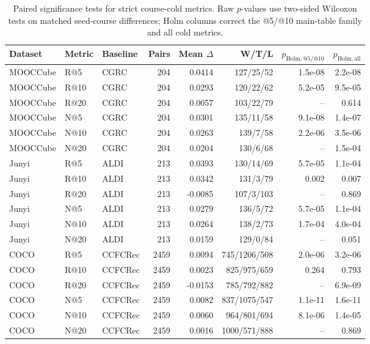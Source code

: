 \begin{table}[t]
\centering
\caption{Paired significance tests for strict course-cold metrics. Raw \(p\)-values use two-sided Wilcoxon tests on matched seed-course differences; Holm columns correct the @5/@10 main-table family and all cold metrics.}
\label{tab:supp-significance-tests}
\tablecaptiongap
\small
\setlength{\tabcolsep}{3.4pt}
\begin{tabular*}{\textwidth}{@{\extracolsep{\fill}}lllrrrrr}
\toprule
Dataset & Metric & Baseline & Pairs & Mean \(\Delta\) & W/T/L & \(p_{\mathrm{Holm,@5/@10}}\) & \(p_{\mathrm{Holm,all}}\) \\
\midrule
MOOCCube & R@5 & CGRC & 204 & 0.0414 & 127/25/52 & 1.5e-08 & 2.2e-08 \\
MOOCCube & R@10 & CGRC & 204 & 0.0293 & 120/22/62 & 5.2e-05 & 9.5e-05 \\
MOOCCube & R@20 & CGRC & 204 & 0.0057 & 103/22/79 & -- & 0.614 \\
MOOCCube & N@5 & CGRC & 204 & 0.0301 & 135/11/58 & 9.1e-08 & 1.4e-07 \\
MOOCCube & N@10 & CGRC & 204 & 0.0263 & 139/7/58 & 2.2e-06 & 3.5e-06 \\
MOOCCube & N@20 & CGRC & 204 & 0.0204 & 130/6/68 & -- & 1.5e-04 \\
Junyi & R@5 & ALDI & 213 & 0.0393 & 130/14/69 & 5.7e-05 & 1.1e-04 \\
Junyi & R@10 & ALDI & 213 & 0.0342 & 131/3/79 & 0.002 & 0.007 \\
Junyi & R@20 & ALDI & 213 & -0.0085 & 107/3/103 & -- & 0.869 \\
Junyi & N@5 & ALDI & 213 & 0.0279 & 136/5/72 & 5.7e-05 & 1.1e-04 \\
Junyi & N@10 & ALDI & 213 & 0.0264 & 138/2/73 & 1.7e-04 & 4.0e-04 \\
Junyi & N@20 & ALDI & 213 & 0.0159 & 129/0/84 & -- & 0.051 \\
COCO & R@5 & CCFCRec & 2459 & 0.0094 & 745/1206/508 & 2.0e-06 & 3.2e-06 \\
COCO & R@10 & CCFCRec & 2459 & 0.0023 & 825/975/659 & 0.264 & 0.793 \\
COCO & R@20 & CCFCRec & 2459 & -0.0153 & 785/792/882 & -- & 6.9e-09 \\
COCO & N@5 & CCFCRec & 2459 & 0.0082 & 837/1075/547 & 1.1e-11 & 1.6e-11 \\
COCO & N@10 & CCFCRec & 2459 & 0.0060 & 964/801/694 & 8.1e-06 & 1.4e-05 \\
COCO & N@20 & CCFCRec & 2459 & 0.0016 & 1000/571/888 & -- & 0.869 \\
\bottomrule
\end{tabular*}
\end{table}

